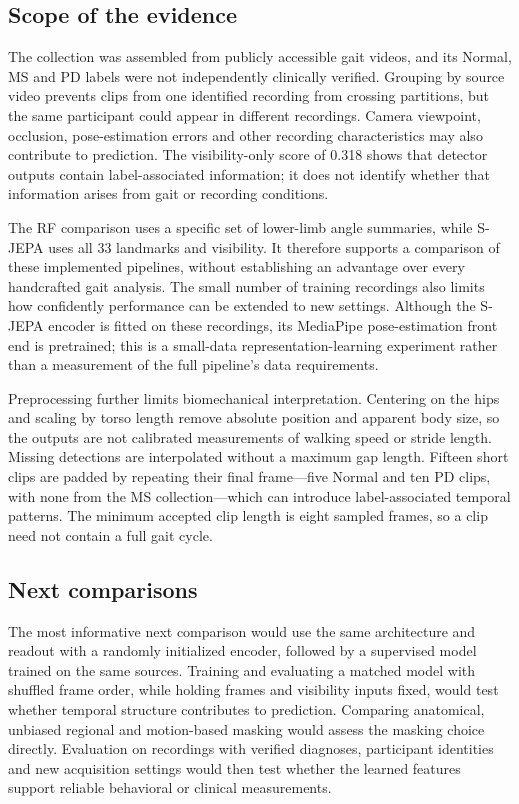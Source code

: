 \documentclass[10pt,twocolumn,letterpaper]{article}
\begin{document}
\subsection{Scope of the evidence}
The collection was assembled from publicly accessible gait videos, and its Normal, MS and PD labels were not independently clinically verified. Grouping by source video prevents clips from one identified recording from crossing partitions, but the same participant could appear in different recordings. Camera viewpoint, occlusion, pose-estimation errors and other recording characteristics may also contribute to prediction. The visibility-only score of 0.318 shows that detector outputs contain label-associated information; it does not identify whether that information arises from gait or recording conditions.

The RF comparison uses a specific set of lower-limb angle summaries, while S-JEPA uses all 33 landmarks and visibility. It therefore supports a comparison of these implemented pipelines, without establishing an advantage over every handcrafted gait analysis. The small number of training recordings also limits how confidently performance can be extended to new settings. Although the S-JEPA encoder is fitted on these recordings, its MediaPipe pose-estimation front end is pretrained; this is a small-data representation-learning experiment rather than a measurement of the full pipeline's data requirements.

Preprocessing further limits biomechanical interpretation. Centering on the hips and scaling by torso length remove absolute position and apparent body size, so the outputs are not calibrated measurements of walking speed or stride length. Missing detections are interpolated without a maximum gap length. Fifteen short clips are padded by repeating their final frame---five Normal and ten PD clips, with none from the MS collection---which can introduce label-associated temporal patterns. The minimum accepted clip length is eight sampled frames, so a clip need not contain a full gait cycle.

\subsection{Next comparisons}
The most informative next comparison would use the same architecture and readout with a randomly initialized encoder, followed by a supervised model trained on the same sources. Training and evaluating a matched model with shuffled frame order, while holding frames and visibility inputs fixed, would test whether temporal structure contributes to prediction. Comparing anatomical, unbiased regional and motion-based masking would assess the masking choice directly. Evaluation on recordings with verified diagnoses, participant identities and new acquisition settings would then test whether the learned features support reliable behavioral or clinical measurements.
\end{document}
